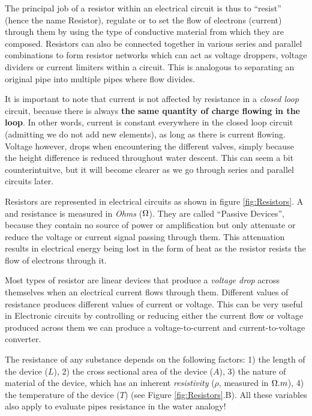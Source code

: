 The principal job of a resistor within an electrical circuit is thus to “resist” (hence the name Resistor), regulate or to set the flow of electrons (current) through them by using the type of conductive material from which they are composed. Resistors can also be connected together in various series and parallel combinations to form resistor networks which can act as voltage droppers, voltage dividers or current limiters within a circuit. This is analogous to separating an original pipe into multiple pipes where flow divides.  

It is important to note that current is not affected by resistance in a \textit{closed loop} circuit, because there is always \textbf{the same quantity of charge flowing in the loop}. In other words, current is constant everywhere in the closed loop circuit (admitting we do not add new elements), as long as there is current flowing.  Voltage however, drops when encountering the different valves, simply because the height difference is reduced throughout water descent. This can seem a bit counterintuitve, but it will become clearer as we go through series and parallel circuits later.  

Resistors are represented in electrical circuits as shown in figure \ref{fig:Resistors}. A and resistance is measured in \textit{Ohms} ($\ohm$). They are called “Passive Devices”, because they contain no source of power or amplification but only attenuate or reduce the voltage or current signal passing through them. This attenuation results in electrical energy being lost in the form of heat as the resistor resists the flow of electrons through it.

Most types of resistor are linear devices that produce a \textit{voltage drop} across themselves when an electrical current flows through them. Different values of resistance produces different values of current or voltage. This can be very useful in Electronic circuits by controlling or reducing either the current flow or voltage produced across them we can produce a voltage-to-current and current-to-voltage converter.

The resistance of any substance depends on the following factors: 1) the length of the device ($L$), 2) the cross sectional area of the device ($A$), 3) the nature of material of the device, which has an inherent \textit{resistivity} ($\rho$, measured in $\ohm.m$), 4) the temperature of the device ($T$) (see Figure \ref{fig:Resistors}.B). All these variables also apply to evaluate pipes resistance in the water analogy! 

